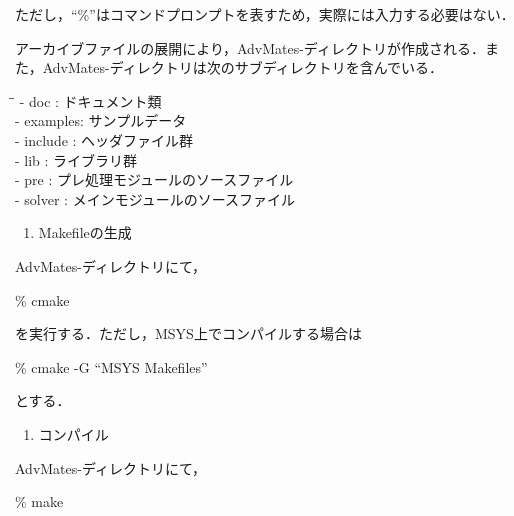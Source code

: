 ただし，``\%''はコマンドプロンプトを表すため，実際には入力する必要はない．

アーカイブファイルの展開により，AdvMates-{\advmatesver}ディレクトリが作成される．また，AdvMates-{\advmatesver}ディレクトリは次のサブディレクトリを含んでいる．

\begin{tabbing}
  \hspace{1em}\=\hspace{10em}\=\hfill\kill
  \>- doc     \>: ドキュメント類\\
  \>- examples\>: サンプルデータ\\
  \>- include \>: ヘッダファイル群\\
  \>- lib     \>: ライブラリ群\\
  \>- pre     \>: プレ処理モジュールのソースファイル\\
  \>- solver  \>: メインモジュールのソースファイル\\
\end{tabbing}

\begin{enumerate}
  \setcounter{enumi}{\value{buildnum}}
  \renewcommand{\labelenumi}{(\arabic{enumi})}
\item Makefileの生成
  \setcounter{buildnum}{\value{enumi}}
\end{enumerate}

AdvMates-{\advmatesver}ディレクトリにて，

\begin{screen}
  \% cmake
\end{screen}

を実行する．ただし，MSYS上でコンパイルする場合は

\begin{screen}
  \% cmake -G ``MSYS Makefiles''
\end{screen}

とする．\\

\begin{enumerate}
  \setcounter{enumi}{\value{buildnum}}
  \renewcommand{\labelenumi}{(\arabic{enumi})}
\item コンパイル
  \setcounter{buildnum}{\value{enumi}}
\end{enumerate}

AdvMates-{\advmatesver}ディレクトリにて，

\begin{screen}
  \% make
\end{screen}

